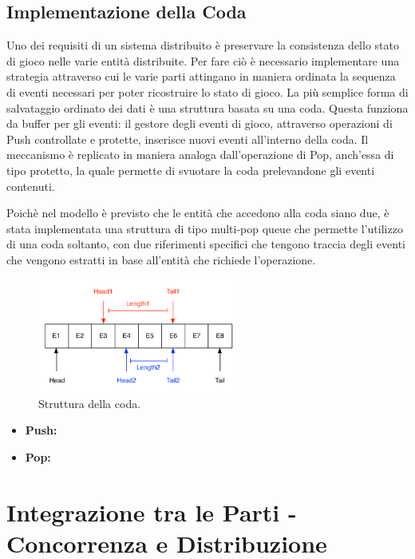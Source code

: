 \documentclass[aps,letterpaper,10pt]{article}
\begin{document}
\subsection{Implementazione della Coda}

Uno dei requisiti di un sistema distribuito \`e preservare la consistenza dello stato di gioco nelle varie entit\`a distribuite. Per fare ci\`o \`e necessario implementare una strategia attraverso cui le varie parti attingano in maniera ordinata la sequenza di eventi necessari per poter ricostruire lo stato di gioco. La pi\`u semplice forma di salvataggio ordinato dei dati \`e una struttura basata su una coda. Questa funziona da buffer per gli eventi: il gestore degli eventi di gioco, attraverso operazioni di Push controllate e protette, inserisce nuovi eventi all'interno della coda. Il meccanismo \`e replicato in maniera analoga dall'operazione di Pop, anch'essa di tipo protetto, la quale permette di svuotare la coda prelevandone gli eventi contenuti. \vspace{3mm}

Poich\`e nel modello \`e previsto che le entit\`a che accedono alla coda siano due, \`e stata implementata una struttura di tipo multi-pop queue che permette l'utilizzo di una coda soltanto, con due riferimenti specifici che tengono traccia degli eventi che vengono estratti in base all'entit\`a che richiede l'operazione.

\begin{figure}[H]
	
	\begin{center}
		\includegraphics[width=250px]{images/queue-struct.pdf}
	\end{center}
\caption{Struttura della coda.}
\end{figure}

\begin{itemize}
\item \textbf{Push:}
\item \textbf{Pop:}
\end{itemize}

\newpage

\section{Integrazione tra le Parti - Concorrenza e Distribuzione}
\end{document}
